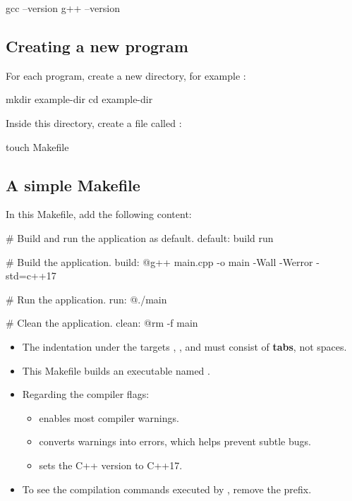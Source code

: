 \begin{shell}
gcc --version
g++ --version
\end{shell}

\subsection{Creating a new program}
\label{c1:sec:newprogram}
For each program, create a new directory, for example :

\begin{shell}
mkdir example-dir
cd example-dir
\end{shell}

\noindent Inside this directory, create a file called :

\begin{shell}
touch Makefile
\end{shell}

\subsection{A simple Makefile}
\label{c1:sec:makefile}
In this Makefile, add the following content:

\begin{makecode}
# Build and run the application as default.
default: build run

# Build the application.
build:
	@g++ main.cpp -o main -Wall -Werror -std=c++17

# Run the application.
run:
	@./main

# Clean the application.
clean:
	@rm -f main
\end{makecode}

\note
\begin{itemize}
  \item The indentation under the targets , , and  must consist of
    \textbf{tabs}, not spaces.
  \item This Makefile builds an executable named .
  \item Regarding the compiler flags:
  \begin{itemize}
    \item {} enables most compiler warnings.
    \item {} converts warnings into errors, which helps prevent subtle bugs.
    \item {} sets the C++ version to C++17.
  \end{itemize}
  \item To see the compilation commands executed by , remove the  prefix.
\end{itemize}

